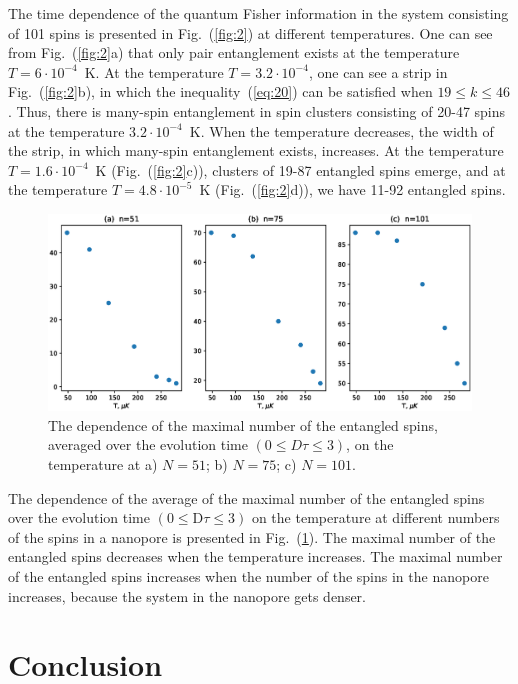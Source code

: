 The time dependence of the quantum Fisher information in the system consisting of 101 spins is presented in Fig.~(\ref{fig:2}) at different temperatures.
One can see from Fig.~(\ref{fig:2}a) that only pair entanglement exists at the temperature $T=6\cdot10^{-4}$~K.
At the temperature $T=3.2\cdot10^{-4}$, one can see a strip in Fig.~(\ref{fig:2}b), in which the inequality~(\ref{eq:20}) can be satisfied when $19 \leq k \leq 46$.
Thus, there is many-spin entanglement in spin clusters consisting of 20-47 spins at the temperature $3.2\cdot10^{-4}$~K.
When the temperature decreases, the width of the strip, in which many-spin entanglement exists, increases.
At the temperature $T=1.6\cdot10^{-4}$~K (Fig.~(\ref{fig:2}c)), clusters of 19-87 entangled spins emerge, and at the temperature $T=4.8\cdot10^{-5}$~K (Fig.~(\ref{fig:2}d)), we have 11-92 entangled spins.

\begin{figure}
  	\includegraphics[width=0.95\linewidth]{entangled_spins_by_n.eps}
	\caption{
	    The dependence of the maximal number of the entangled spins,
	    averaged over the evolution time $(0 \leq D\tau \leq 3)$,
	    on the temperature at a) $N=51$; b) $N=75$; c) $N=101$.
	}
	\label{fig:3}
\end{figure}

The dependence of the average of the maximal number of the entangled spins over the evolution time $({0}\leq \mathrm{D}\tau\leq{3})$ on the temperature at different numbers of the spins in a nanopore is presented in Fig.~(\ref{fig:3}).
The maximal number of the entangled spins decreases when the temperature increases.
The maximal number of the entangled spins increases when the number of the spins in the nanopore increases, because the system in the nanopore gets denser.



\section{Conclusion}
\label{sec:6}


